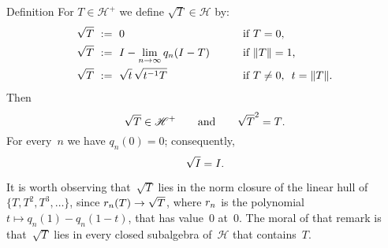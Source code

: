 \documentclass[main.tex]{subfiles}
\begin{document}
%
%
\begin{psec}{5.19}{Definition}
For $T\in{\mathscr H}^+$
we define $\sqrt{T}\in\mathscr H$ by:
\begin{alignat*}{2}
\sqrt{T}\ &:=\ 0 \qquad &&\htam{if }T=0\htam{,}\\
\sqrt{T}\ &:=\ I-\lim_{n\ra\infty} q_n(I-T) \qquad&&\htam{if }\|T\|=1\htam{,}\\
\sqrt{T}\ &:=\ \sqrt{t}\,\sqrt{t^{-1}T}\qquad 
&&\htam{if }T\neq 0\htam{, }\ t=\|T\|\htam{.}
\end{alignat*}
Then
\begin{equation*}
\sqrt{T} \in{\mathscr H}^+ \qquad \text{and} \qquad \sqrt{T}^2=T\text{.}
\end{equation*}
For every~$n$ we have $q_n(0)=0$;
consequently,
\begin{equation*}
\sqrt{I}=I\text{.}
\end{equation*}

It is worth observing that~$\sqrt{T}$ lies in the norm closure
of the linear hull of $\{T,T^2,T^3,\dotsc\}$,
since $r_n(T)\rightarrow \sqrt{T}$,
where $r_n$ is the polynomial 
$t\mapsto q_n(1)-q_n(1-t)$,
that has value~$0$ at~$0$.
The moral of that remark is that~$\sqrt{T}$
lies in every closed subalgebra of~$\mathscr H$
that contains~$T$.
\end{psec}
\clearpage
\end{document}
